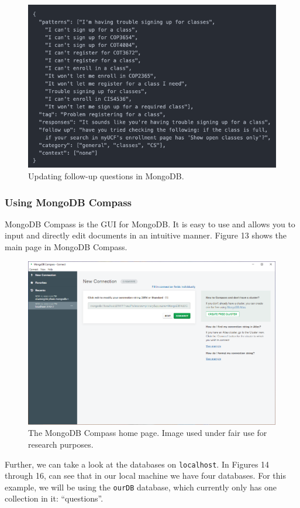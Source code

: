 \documentclass[titlepage, 12pt]{article}
\begin{document}
\begin{figure}[h]
    \centering\includegraphics[width=0.75\linewidth]{images/mongodb-commands-2.png}
    \caption{Updating follow-up questions in MongoDB.}
\end{figure}

\subsubsection{Using MongoDB Compass}

MongoDB Compass is the GUI for MongoDB. It is easy to use and allows you to input and directly edit documents in an intuitive manner. Figure 13 shows the main page in MongoDB Compass.

\begin{figure}[h]
    \centering\includegraphics[width=0.75\linewidth]{images/mongodb-compass-1.png}
    \caption{The MongoDB Compass home page. Image used under fair use for research purposes.}
\end{figure}

Further, we can take a look at the databases on \texttt{localhost}. In Figures 14 through 16, can see that in our local machine we have four databases. For this example, we will be using the \texttt{ourDB} database, which currently only has one collection in it: “questions”.
\end{document}
